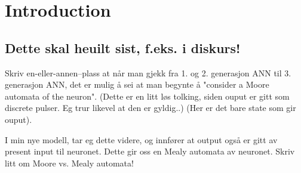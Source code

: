

\section{Introduction}

	\subsection{Dette skal heuilt sist, f.eks. i diskurs!}
	Skriv en-eller-annen--plass at når man gjekk fra 1. og 2. generasjon ANN til 3. generasjon ANN, det er mulig å sei at man begynte å "consider a Moore automata of the neuron".
	(Dette er en litt løs tolking, siden ouput er gitt som discrete pulser. Eg trur likevel at den er gyldig..)
	(Her er det bare state som gir ouput).
	
	I min nye modell, tar eg dette videre, og innfører at output også er gitt av present input til neuronet. Dette gir oss en Mealy automata av neuronet.
	Skriv litt om Moore vs. Mealy automata!


